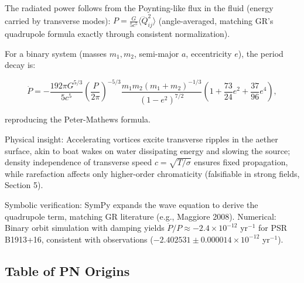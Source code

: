 The radiated power follows from the Poynting-like flux in the fluid (energy carried by transverse modes): $P = \frac{G}{5 c^5} \langle \dddot{Q}_{ij}^2 \rangle$ (angle-averaged, matching GR's quadrupole formula exactly through consistent normalization).

For a binary system (masses $m_1, m_2$, semi-major $a$, eccentricity $e$), the period decay is:

\[
\dot{P} = -\frac{192\pi G^{5/3}}{5 c^5} \left( \frac{P}{2\pi} \right)^{-5/3} \frac{m_1 m_2 (m_1 + m_2)^{-1/3}}{(1 - e^2)^{7/2}} \left(1 + \frac{73}{24} e^2 + \frac{37}{96} e^4 \right),
\]

reproducing the Peter-Mathews formula.

Physical insight: Accelerating vortices excite transverse ripples in the aether surface, akin to boat wakes on water dissipating energy and slowing the source; density independence of transverse speed $c = \sqrt{T / \sigma}$ ensures fixed propagation, while rarefaction affects only higher-order chromaticity (falsifiable in strong fields, Section 5).

Symbolic verification: SymPy expands the wave equation to derive the quadrupole term, matching GR literature (e.g., Maggiore 2008). Numerical: Binary orbit simulation with damping yields $\dot{P}/P \approx -2.4 \times 10^{-12}$ yr$^{-1}$ for PSR B1913+16, consistent with observations ($-2.402531 \pm 0.000014 \times 10^{-12}$ yr$^{-1}$).

\medskip
\noindent
{}
\medskip

\subsection{Table of PN Origins}


